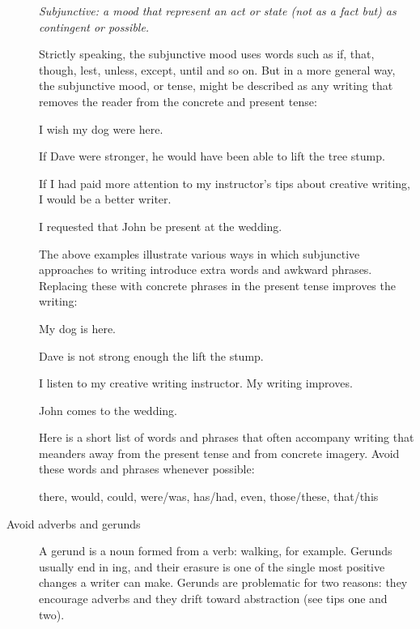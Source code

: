 \documentclass[letterpaper,10pt,headsepline]{scrreprt}
\begin{document}
\begin{description}
\textit{Subjunctive: a mood that represent an act or state (not as a fact but) as contingent or possible.
}

Strictly speaking, the subjunctive mood uses words such as \textsf{if, that, though, lest, unless, except, until} and so on. But in a more general way, the subjunctive mood, or tense, might be described as any writing that removes the reader from the concrete and present tense:
\vspace{1em}


\textsf{I wish my dog were here.}
\vspace{1em}

\textsf{If Dave were stronger, he would have been able to lift the tree stump.}
\vspace{1em}

\textsf{If I had paid more attention to my instructor's tips about creative writing, I would be a better writer.}
\vspace{1em}

\textsf{I requested that John be present at the wedding.}
\vspace{1em}


The above examples illustrate various ways in which subjunctive approaches to writing introduce extra words and awkward phrases. Replacing these with concrete phrases in the present tense improves the writing:
\vspace{1em}

\textsf{My dog is here.}
\vspace{1em}

\textsf{Dave is not strong enough the lift the stump.}
\vspace{1em}

\textsf{I listen to my creative writing instructor. My writing improves.}
\vspace{1em}

\textsf{John comes to the wedding.}
\vspace{1em}

Here is a short list of words and phrases that often accompany writing that meanders away from the present tense and from concrete imagery. Avoid these words and phrases whenever possible:
\vspace{1em}

\textsf{there, would, could, were/was, has/had, even, those/these, that/this}
\vspace{1em}

\item [Avoid adverbs and gerunds] A gerund is a noun formed from a verb: walking, for example. Gerunds usually end in \textsf{ing}, and their erasure is one of the single most positive changes a writer can make. Gerunds are problematic for two reasons: they encourage adverbs and they drift toward abstraction (see tips one and two).


\end{description}
\end{document}
